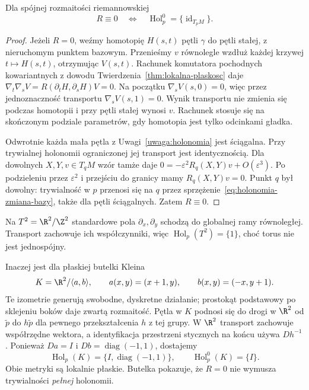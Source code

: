\begin{stwierdzenie}
\label{prop:holonomia-plaskosc}
Dla spójnej rozmaitości riemannowskiej
\[
 R\equiv0\quad\Longleftrightarrow\quad
 \operatorname{Hol}^0_p=\{\operatorname{id}_{T_pM}\}.
\]
\end{stwierdzenie}
\begin{proof}
Jeżeli $R=0$, weźmy homotopię $H(s,t)$ pętli $\gamma$
do pętli stałej, z nieruchomym punktem bazowym.
Przenieśmy $v$ równolegle wzdłuż każdej krzywej
$t\mapsto H(s,t)$, otrzymując $V(s,t)$.
Rachunek komutatora pochodnych kowariantnych
z dowodu Twierdzenia~\ref{thm:lokalna-plaskosc} daje
$\nabla_t\nabla_sV=R(\partial_tH,\partial_sH)V=0$.
Na początku $\nabla_sV(s,0)=0$, więc przez jednoznaczność
transportu $\nabla_sV(s,1)=0$. Wynik transportu nie
zmienia się podczas homotopii i przy pętli stałej
wynosi $v$. Rachunek stosuje się na skończonym podziale
parametrów, gdy homotopia jest tylko odcinkami gładka.

Odwrotnie każda mała pętla z Uwagi~\ref{uwaga:holonomia}
jest ściągalna. Przy trywialnej holonomii ograniczonej
jej transport jest identycznością. Dla dowolnych
$X,Y,v\in T_qM$ wzór tamże daje
$0=-\varepsilon^2R_q(X,Y)v+O(\varepsilon^3)$.
Po podzieleniu przez $\varepsilon^2$ i przejściu
do granicy mamy $R_q(X,Y)v=0$. Punkt $q$ był dowolny:
trywialność w $p$ przenosi się na $q$ przez
sprzężenie~\eqref{eq:holonomia-zmiana-bazy}, także
dla pętli ściągalnych. Zatem $R\equiv0$.
\end{proof}

\begin{przyklad}
\label{prz:holonomia-torus-klein}
Na $T^2=\R^2/\Z^2$ standardowe pola $\partial_x,\partial_y$
schodzą do globalnej ramy równoległej. Transport zachowuje
ich współczynniki, więc $\operatorname{Hol}_p(T^2)=\{1\}$,
choć torus nie jest jednospójny.

Inaczej jest dla płaskiej butelki Kleina
\[
 K=\R^2/\langle a,b\rangle,
 \qquad a(x,y)=(x+1,y),\qquad b(x,y)=(-x,y+1).
\]
Te izometrie generują swobodne, dyskretne działanie;
prostokąt podstawowy po sklejeniu boków daje zwartą
rozmaitość. Pętla w $K$ podnosi się do drogi w $\R^2$
od $\widetilde p$ do $h\widetilde p$ dla pewnego
przekształcenia $h$ z tej grupy. W $\R^2$ transport
zachowuje współrzędne wektora, a identyfikacja przestrzeni
stycznych na końcu używa $D h^{-1}$. Ponieważ
$Da=I$ i $Db=\operatorname{diag}(-1,1)$, dostajemy
\[
 \operatorname{Hol}_p(K)
   =\{I,\operatorname{diag}(-1,1)\},
 \qquad \operatorname{Hol}^0_p(K)=\{I\}.
\]
Obie metryki są lokalnie płaskie. Butelka pokazuje,
że $R=0$ nie wymusza trywialności \emph{pełnej}
holonomii.
\end{przyklad}

